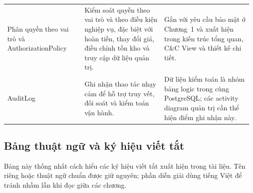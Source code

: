 {\begin{longtable}{@{}>{\raggedright\arraybackslash}p{3.0cm} >{\raggedright\arraybackslash}p{5.0cm} >{\raggedright\arraybackslash}p{4.85cm}@{}}
\addlinespace
Phân quyền theo vai trò và \textsf{AuthorizationPolicy} & Kiểm soát quyền theo vai trò và theo điều kiện nghiệp vụ, đặc biệt với hoàn tiền, thay đổi giá, điều chỉnh tồn kho và truy cập dữ liệu quản trị. & Gắn với yêu cầu bảo mật ở Chương~1 và xuất hiện trong kiến trúc tổng quan, C\&C View và thiết kế chi tiết. \\
\addlinespace
\textsf{AuditLog} & Ghi nhận thao tác nhạy cảm để hỗ trợ truy vết, đối soát và kiểm toán vận hành. & Dữ liệu kiểm toán là nhóm bảng logic trong cùng \textsf{PostgreSQL}; các activity diagram quản trị cần thể hiện điểm ghi nhận này. \\
\bottomrule
\end{longtable}
\normalsize
}

\subsection{Bảng thuật ngữ và ký hiệu viết tắt}\label{appendix:abbreviations}

Bảng này thống nhất cách hiểu các ký hiệu viết tắt xuất hiện trong tài liệu. Tên riêng hoặc thuật ngữ chuẩn được giữ nguyên; phần diễn giải dùng tiếng Việt để tránh nhầm lẫn khi đọc giữa các chương.

